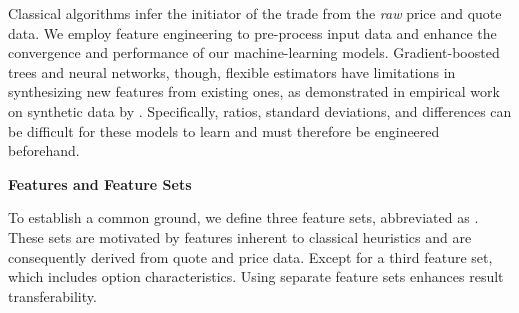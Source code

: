 Classical algorithms infer the initiator of the trade from the \emph{raw} price and quote data. We employ feature engineering to pre-process input data and enhance the convergence and performance of our machine-learning models. Gradient-boosted trees and neural networks, though, flexible estimators have limitations in synthesizing new features from existing ones, as demonstrated in empirical work on synthetic data by \textcite[][4--6]{heatonEmpiricalAnalysisFeature2016}. Specifically, ratios, standard deviations, and differences can be difficult for these models to learn and must therefore be engineered beforehand.

\textbf{Features and Feature Sets}

To establish a common ground, we define three feature sets, abbreviated as . These sets are motivated by features inherent to classical heuristics and are consequently derived from quote and price data. Except for a third feature set, which includes option characteristics. Using separate feature sets enhances result transferability.

